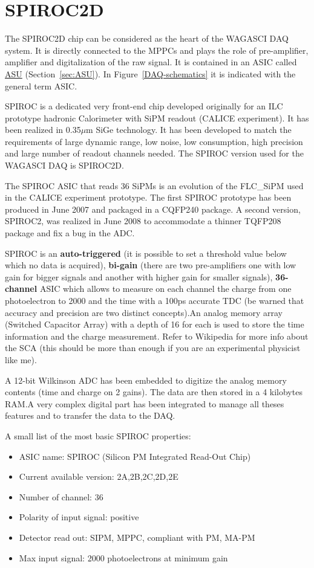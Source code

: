 \section{SPIROC2D}
The SPIROC2D chip can be considered as the heart of the WAGASCI DAQ system. It
is directly connected to the MPPCs and plays the role of pre-amplifier,
amplifier and digitalization of the raw signal. It is contained in an ASIC
called \hyperref[sec:ASU]{ASU} (Section~\ref{sec:ASU}). In
Figure~\ref{DAQ-schematics} it is indicated with the general term ASIC.

SPIROC is a dedicated very front-end chip developed originally for an ILC
prototype hadronic Calorimeter with SiPM readout (CALICE experiment). It has
been realized in 0.35$\mu$m SiGe technology. It has been developed to match the
requirements of large dynamic range, low noise, low consumption, high precision
and large number of readout channels needed. The SPIROC version used for the
WAGASCI DAQ is SPIROC2D.

The SPIROC ASIC that reads 36 SiPMs is an evolution of the FLC\_SiPM used in the
CALICE experiment prototype. The first SPIROC prototype has been produced in
June 2007 and packaged in a CQFP240 package. A second version, SPIROC2, was
realized in June 2008 to accommodate a thinner TQFP208 package and fix a bug in
the ADC.

SPIROC is an \textbf{auto-triggered} (it is possible to set a threshold value
below which no data is acquired), \textbf{bi-gain} (there are two pre-amplifiers
one with low gain for bigger signals and another with higher gain for smaller
signals), \textbf{36-channel} ASIC which allows to measure on each channel the
charge from one photoelectron to 2000 and the time with a 100ps accurate TDC (be
warned that accuracy and precision are two distinct concepts).\@ An analog
memory array (Switched Capacitor Array) with a depth of 16 for each is used to
store the time information and the charge measurement. Refer to Wikipedia for
more info about the SCA (this should be more than enough if you are an
experimental physicist like me).

A 12-bit Wilkinson ADC has been embedded to digitize the analog memory contents
(time and charge on 2 gains). The data are then stored in a 4 kilobytes RAM.\@ A
very complex digital part has been integrated to manage all theses features and
to transfer the data to the DAQ.\@

A small list of the most basic SPIROC properties:
\begin{itemize}
\item ASIC name: SPIROC (Silicon PM Integrated Read-Out Chip)
\item Current available version: 2A,2B,2C,2D,2E
\item Number of channel: 36
\item Polarity of input signal: positive
\item Detector read out: SIPM, MPPC, compliant with PM, MA-PM
\item Max input signal: 2000 photoelectrons at minimum gain
\end{itemize}

